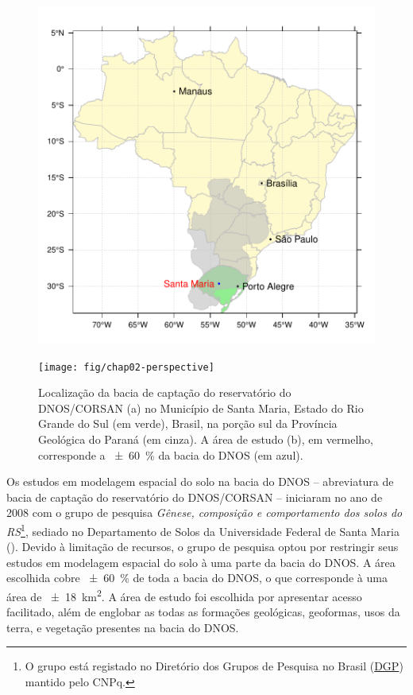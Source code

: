 \begin{figure}[!ht]
\centering
\begin{minipage}[b]{95mm}
\subcaption{}
\includegraphics{fig/chap02-location}
\end{minipage}
\begin{minipage}[b]{95mm}
\subcaption{}
\texttt{[image: fig/chap02-perspective]}
\end{minipage}
\caption{Localização da bacia de captação do reservatório do DNOS/CORSAN (a) no Município de Santa Maria, 
Estado do Rio Grande do Sul (em verde), Brasil, na porção sul da Província Geológica do Paraná (em cinza). A 
área de estudo (b), em vermelho, corresponde a \SI{\pm60}{\percent} da bacia do DNOS (em azul).}
\label{fig:chap02-location}
\end{figure}

\def\footsolosdors{\footnote{O grupo está registado no Diretório dos Grupos de Pesquisa no Brasil 
(\href{http://dgp.cnpq.br/dgp/espelhogrupo/9373361709890764}{DGP}) mantido pelo CNPq.}}

Os estudos em modelagem espacial do solo na bacia do DNOS -- abreviatura de bacia de captação do reservatório 
do DNOS/CORSAN -- iniciaram no ano de \num{2008} com o grupo de pesquisa \emph{Gênese, composição e 
comportamento dos solos do RS}\footsolosdors{}, sediado no Departamento de Solos da Universidade Federal 
de Santa Maria (\ufsm). Devido à limitação de recursos, o grupo de pesquisa optou por restringir seus estudos 
em modelagem espacial do solo à uma parte da bacia do DNOS. A área escolhida cobre \SI{\pm60}{\percent} de toda 
a bacia do DNOS, o que corresponde à uma área de \SI{\pm18}{\square\kilo\metre}. A área de estudo foi 
escolhida por apresentar acesso facilitado, além de englobar as todas as formações geológicas, geoformas, usos 
da terra, e vegetação presentes na bacia do DNOS.

